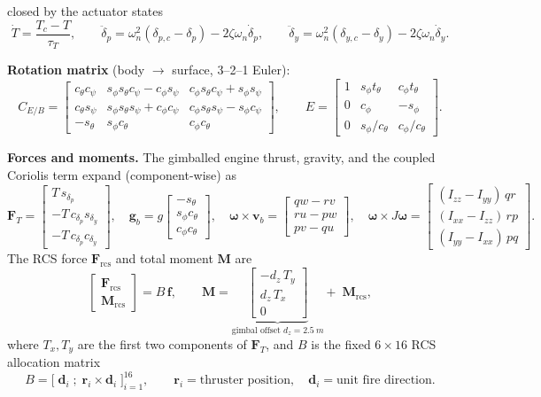 \documentclass[11pt]{article}
\newcommand{\cf}{c_\phi}\newcommand{\sfi}{s_\phi}
\newcommand{\cth}{c_\theta}\newcommand{\sth}{s_\theta}\newcommand{\tth}{t_\theta}
\newcommand{\cps}{c_\psi}\newcommand{\sps}{s_\psi}
\begin{document}
closed by the actuator states
\[
\dot T=\frac{T_c-T}{\tau_T},
\qquad
\ddot\delta_p=\omega_n^2(\delta_{p,c}-\delta_p)-2\zeta\omega_n\dot\delta_p,
\qquad
\ddot\delta_y=\omega_n^2(\delta_{y,c}-\delta_y)-2\zeta\omega_n\dot\delta_y .
\]

\noindent\textbf{Rotation matrix} (body $\to$ surface, 3--2--1 Euler):
\[
C_{E/B}=
\begin{bmatrix}
\cth\cps & \sfi\sth\cps-\cf\sps & \cf\sth\cps+\sfi\sps\\[2pt]
\cth\sps & \sfi\sth\sps+\cf\cps & \cf\sth\sps-\sfi\cps\\[2pt]
-\sth    & \sfi\cth            & \cf\cth
\end{bmatrix},
\qquad
E=
\begin{bmatrix}
1 & \sfi\tth & \cf\tth\\[2pt]
0 & \cf      & -\sfi\\[2pt]
0 & \sfi/\cth & \cf/\cth
\end{bmatrix}.
\]

\noindent\textbf{Forces and moments.} The gimballed engine thrust, gravity, and
the coupled Coriolis term expand (component-wise) as
\[
\bm F_T=
\begin{bmatrix} T\,s_{\delta_p}\\[2pt] -T\,c_{\delta_p}s_{\delta_y}\\[2pt] -T\,c_{\delta_p}c_{\delta_y}\end{bmatrix}\!,
\quad
\bm g_b= g\begin{bmatrix}-\sth\\ \sfi\cth\\ \cf\cth\end{bmatrix}\!,
\quad
\bm\omega\times\bm v_b=
\begin{bmatrix} q w-r v\\ r u-p w\\ p v-q u\end{bmatrix}\!,
\quad
\bm\omega\times J\bm\omega=
\begin{bmatrix}(I_{zz}-I_{yy})\,qr\\ (I_{xx}-I_{zz})\,rp\\ (I_{yy}-I_{xx})\,pq\end{bmatrix}\!.
\]
The RCS force $\bm F_{\mathrm{rcs}}$ and total moment $\bm M$ are
\[
\begin{bmatrix}\bm F_{\mathrm{rcs}}\\[2pt]\bm M_{\mathrm{rcs}}\end{bmatrix}
= B\,\bm f,
\qquad
\bm M=\underbrace{\begin{bmatrix}-d_z\,T_y\\ d_z\,T_x\\ 0\end{bmatrix}}_{\text{gimbal offset }d_z=\SI{2.5}{m}}
+\;\bm M_{\mathrm{rcs}},
\]
where $T_x,T_y$ are the first two components of $\bm F_T$, and $B$ is the fixed
$6\times16$ RCS allocation matrix
\[
B=\big[\; \bm d_i \;;\; \bm r_i\times\bm d_i \;\big]_{i=1}^{16},
\qquad
\bm r_i=\text{thruster position},\quad \bm d_i=\text{unit fire direction}.
\]
\end{document}
